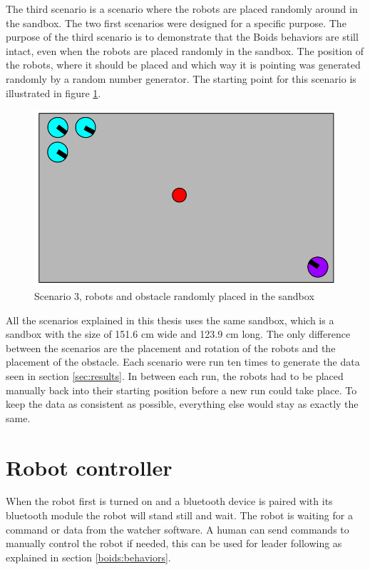 The third scenario is a scenario where the robots are placed randomly around in the sandbox. The two first scenarios were designed for a specific purpose. The purpose of the third scenario is to demonstrate that the Boids behaviors are still intact, even when the robots are placed randomly in the sandbox. The position of the robots, where it should be placed and which way it is pointing was generated randomly by a random number generator. The starting point for this scenario is illustrated in figure \ref{fig:scenario2}.
\begin{figure}[h]
\begin{center}
\includegraphics[width=0.8\linewidth]{figs/scenario1}
\end{center}
\caption[scenario 3]{Scenario 3, robots and obstacle randomly placed in the sandbox}
\label{fig:scenario2}
\end{figure}

All the scenarios explained in this thesis uses the same sandbox, which is a sandbox with the size of 151.6 cm wide and 123.9 cm long. The only difference between the scenarios are the placement and rotation of the robots and the placement of the obstacle. Each scenario were run ten times to generate the data seen in section \ref{sec:results}.
In between each run, the robots had to be placed manually back into their starting position before a new run could take place. To keep the data as consistent as possible, everything else would stay as exactly the same.

\section{Robot controller}
When the robot first is turned on and a bluetooth device is paired with its bluetooth module the robot will stand still and wait. The robot is waiting for a command or data from the watcher software. A human can send commands to manually control the robot if needed, this can be used for leader following as explained in section \ref{boids:behaviors}. 

